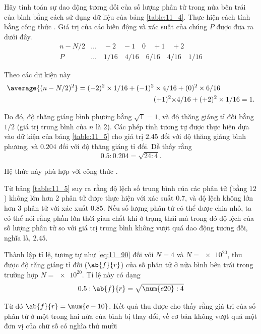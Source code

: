 Hãy tính toán sự dao động tương đối của số lượng phân tử trong nửa bên trái của bình bằng cách sử dụng dữ liệu của bảng \ref{table:11_4}. Thực hiện cách tính bằng công thức . Giá trị của các biến động và xác suất của chúng $P$ được đưa ra dưới đây.
\begin{align*}
	n-N/2 & \ldots \quad -2 \quad -1 \quad 0 \quad +1 \quad +2\\
	P & \ldots \quad 1/16 \quad 4/16 \quad 6/16 \quad 4/16 \quad 1/16
\end{align*}

Theo các dữ kiện này
\begin{align*}
	\average{(n-N/2)^2} = (-2)^2 \times 1/16 + (-1)^2 \times 4/16 &+ (0)^2 \times 6/16 \\
	(+1)^2 \times &4/16 + (+2)^2 \times 1/16 = 1.
\end{align*}

\noindent
Do đó, độ thăng giáng bình phương bằng $\sqrt{1}=1$, và độ thăng giáng tỉ đối bằng $1/2$ (giá trị trung bình của $n$ là $2$). Các phép tính tương tự được thực hiện dựa vào dữ kiện của bảng \ref{table:11_5} cho giá trị $2.45$ đối với độ thăng giáng bình phương, và $0.204$ đối với độ thăng giáng tỉ đối. Dễ thấy rằng
\begin{equation}\label{eq:11_90}
	0.5 : 0.204 = \sqrt{24 : 4}.
\end{equation}

\noindent
Hệ thức này phù hợp với công thức .

Từ bảng \ref{table:11_5} suy ra rằng độ lệch số trung bình của các phân tử (bằng $12$) không lớn hơn $2$ phân tử được thực hiện với xác suất $0.7$, và độ lệch không lớn hơn $3$ phân tử với xác xuất $0.85$. Nếu số lượng phân tử có thể được chia nhỏ, ta có thể nói rằng phần lớn thời gian chất khí ở trạng thái mà trong đó độ lệch của số lượng phân tử so với giá trị trung bình không vượt quá dao động tương đối, nghĩa là, $2.45$.

Thành lập tỉ lệ, tương tự như \eqref{eq:11_90} đối với $N=4$ và $N=\num{e20}$, thu được độ tăng giáng tỉ đối ($\ab{f}{r}$) của số phân tử ở nửa bình bên trái trong trường hợp $N=\num{e20}$. Tỉ lệ này có dạng
\begin{equation*}
	0.5 : \ab{f}{r}=\sqrt{\num{e20} : 4}
\end{equation*}

\noindent
Từ đó $\ab{f}{r}=\num{e-10}$. Kết quả thu được cho thấy rằng giá trị của số phân tử ở một trong hai nửa của bình bị thay đổi, về cơ bản không vượt quá một đơn vị của chữ số có nghĩa thứ mười

